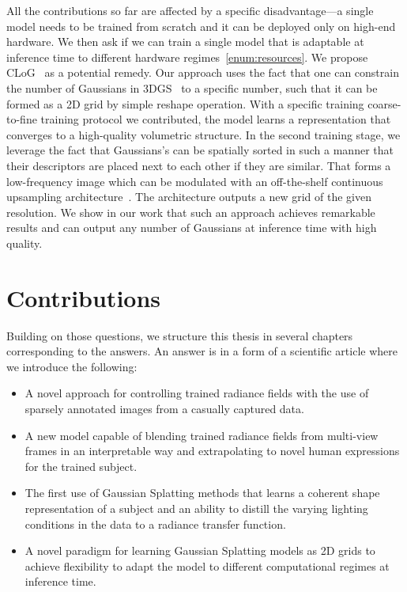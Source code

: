   All the contributions so far are affected by a specific disadvantage---a
  single model needs to be trained from scratch and it can be deployed only on
  high-end hardware.
  We then ask if we can train a single model that is adaptable at inference time
  to different hardware regimes~\ref{enum:resources}.
  We propose CLoG~\cite{kania2024clog} as a potential remedy.
  Our approach uses the fact that one can constrain the number of Gaussians in
  3DGS~\cite{kerbl20233d} to a specific number, such that it can be formed as a
  2D grid by simple reshape operation.
  With a specific training coarse-to-fine training protocol we contributed, the
  model learns a representation that converges to a high-quality volumetric
  structure.
  In the second training stage, we leverage the fact that Gaussians's can be
  spatially sorted in such a manner that their descriptors are placed next to
  each other if they are similar.
  That forms a low-frequency image which can be modulated with an off-the-shelf
  continuous upsampling architecture~\cite{vasconcelos2023cuf}.
  The architecture outputs a new grid of the given resolution.
  We show in our work that such an approach achieves remarkable results and can
  output any number of Gaussians at inference time with high quality.

\section{Contributions}
  Building on those questions, we structure this thesis in several chapters
  corresponding to the answers.
  An answer is in a form of a scientific article where we introduce the following:
  \begin{itemize}
    \item A novel approach for controlling trained radiance fields with the use of sparsely annotated images from a casually captured data.
    \item A new model capable of blending trained radiance fields from multi-view frames in an interpretable way and extrapolating to novel human expressions for the trained subject.
    \item The first use of Gaussian Splatting methods that learns a coherent shape representation of a subject and an ability to distill the varying lighting conditions in the data to a radiance transfer function.
    \item A novel paradigm for learning Gaussian Splatting models as 2D grids to achieve flexibility to adapt the model to different computational regimes at inference time.
  \end{itemize}

